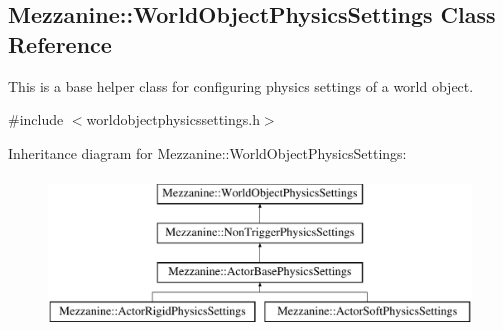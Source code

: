 \hypertarget{classMezzanine_1_1WorldObjectPhysicsSettings}{
\subsection{Mezzanine::WorldObjectPhysicsSettings Class Reference}
\label{classMezzanine_1_1WorldObjectPhysicsSettings}
}


This is a base helper class for configuring physics settings of a world object.  




{\ttfamily \#include $<$worldobjectphysicssettings.h$>$}

Inheritance diagram for Mezzanine::WorldObjectPhysicsSettings:\begin{figure}[H]
\begin{center}
\leavevmode
\includegraphics[height=4.000000cm]{classMezzanine_1_1WorldObjectPhysicsSettings}
\end{center}
\end{figure}
